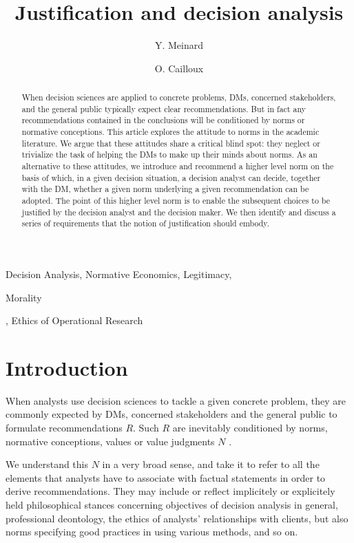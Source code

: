 \documentclass[preprint, french, english, 11pt, authoryear]{elsarticle}%
\begin{document}
\hypersetup{citecolor=black}
\title{Justification and decision analysis}

\author[ld]{Y. Meinard}
\author[ld]{O. Cailloux}
\address[ld]{Universit\'e Paris-Dauphine, PSL Research University, CNRS, UMR [7243], LAMSADE, 75016 PARIS, FRANCE}

\begin{abstract}
\begin{changebar}When decision sciences are applied to concrete problems, \acp{DM}, concerned stakeholders, and the general public typically expect clear recommendations.
But in fact any recommendations contained in the conclusions will be conditioned by norms or normative conceptions.
This article explores the attitude to norms in the academic literature. We argue that these attitudes share a critical blind spot: they neglect or trivialize the task of helping the \acp{DM} to make up their minds about norms.
As an alternative to these attitudes, we introduce and recommend a higher level norm on the basis of which, in a given decision situation, a decision analyst can decide, together with the \ac{DM}, whether a given norm underlying a given recommendation can be adopted.
The point of this higher level norm is to enable the subsequent choices to be justified by the decision analyst and the decision maker. We then identify and discuss a series of requirements that the notion of justification should embody.\end{changebar}

\end{abstract}
\acresetall
\begin{keyword}
Decision Analysis, Normative Economics, Legitimacy, \begin{changebar}Morality\end{changebar}, Ethics of Operational Research
\end{keyword}

\maketitle

\section{Introduction}
When analysts use decision sciences to tackle a given concrete problem, they are commonly expected by \acp{DM}, concerned stakeholders and the general public to formulate recommendations $R$. 
Such $R$ are inevitably conditioned by norms, normative conceptions, values or value judgments $N$ \citep{funtowicz_science_1993,brans_ethics_2002,mingers_ethics_2011}.
\begin{changebar}We understand this $N$ in a very broad sense, and take it to refer to all the elements that analysts have to associate with factual statements in order to derive recommendations. 
They may include or reflect implicitely or explicitely held philosophical stances concerning objectives of decision analysis in general, professional deontology, the ethics of analysts' relationships with clients, but also norms specifying good practices in using various methods, and so on.\end{changebar}
\end{document}
